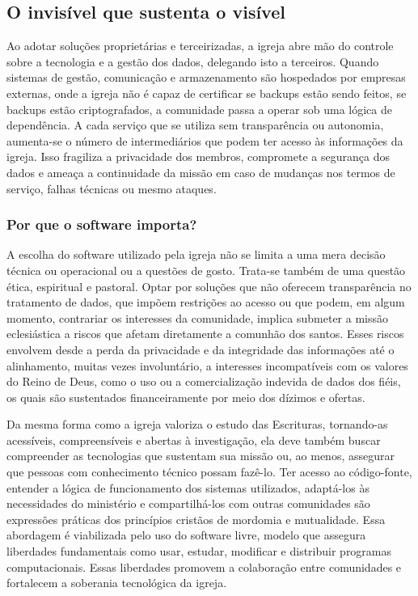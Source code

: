 \subsection{O invisível que sustenta o visível}

Ao adotar soluções proprietárias e terceirizadas, a igreja abre mão do controle sobre a tecnologia e a gestão dos dados, delegando isto a terceiros. Quando sistemas de gestão, comunicação e armazenamento são hospedados por empresas externas, onde a igreja não é capaz de certificar se backups estão sendo feitos, se backups estão criptografados, a comunidade passa a operar sob uma lógica de dependência. A cada serviço que se utiliza sem transparência ou autonomia, aumenta-se o número de intermediários que podem ter acesso às informações da igreja. Isso fragiliza a privacidade dos membros, compromete a segurança dos dados e ameaça a continuidade da missão em caso de mudanças nos termos de serviço, falhas técnicas ou mesmo ataques.

\subsubsection{Por que o software importa?}

A escolha do software utilizado pela igreja não se limita a uma mera decisão técnica ou operacional ou a questões de gosto. Trata-se também de uma questão ética, espiritual e pastoral. Optar por soluções que não oferecem transparência no tratamento de dados, que impõem restrições ao acesso ou que podem, em algum momento, contrariar os interesses da comunidade, implica submeter a missão eclesiástica a riscos que afetam diretamente a comunhão dos santos. Esses riscos envolvem desde a perda da privacidade e da integridade das informações até o alinhamento, muitas vezes involuntário, a interesses incompatíveis com os valores do Reino de Deus, como o uso ou a comercialização indevida de dados dos fiéis, os quais são sustentados financeiramente por meio dos dízimos e ofertas.

Da mesma forma como a igreja valoriza o estudo das Escrituras, tornando-as acessíveis, compreensíveis e abertas à investigação, ela deve também buscar compreender as tecnologias que sustentam sua missão ou, ao menos, assegurar que pessoas com conhecimento técnico possam fazê-lo. Ter acesso ao código-fonte, entender a lógica de funcionamento dos sistemas utilizados, adaptá-los às necessidades do ministério e compartilhá-los com outras comunidades são expressões práticas dos princípios cristãos de mordomia e mutualidade. Essa abordagem é viabilizada pelo uso do software livre, modelo que assegura liberdades fundamentais como usar, estudar, modificar e distribuir programas computacionais. Essas liberdades promovem a colaboração entre comunidades e fortalecem a soberania tecnológica da igreja.

